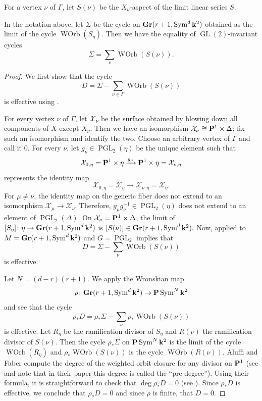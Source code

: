 \documentclass[11pt]{amsart}
\renewcommand {\P}{{\bf P}}
\providecommand {\Gr}{{\bf Gr}}
\providecommand{\GL}{\operatorname{GL}}
\providecommand{\PGL}{\operatorname{PGL}}
\providecommand {\from}{{\colon}}
\providecommand{\Sym}{\operatorname{Sym}}
\DeclareMathOperator{\WOrb}{WOrb}
\begin{document}
For a vertex \(\nu\) of \(\Gamma\), let \(S(\nu)\) be the \(X_\nu\)-aspect of the limit linear series \(S\).
\begin{theorem}\label{thm:degeneration}
  In the notation above, let \(\Sigma\) be the cycle on \(\Gr(r+1, \Sym^d\k^2)\) obtained as the limit of the cycle \(\WOrb(S_\eta)\).
  Then we have the equality of \(\GL(2)\)-invariant cycles 
  \[
    \Sigma = \sum_\nu \WOrb(S(\nu)).
  \]
\end{theorem}
\begin{proof}
  We first show that the cycle
  \[ D = \Sigma - \sum_{\nu \in \Gamma} \WOrb(S(\nu))\]
  is effective using .

    For every vertex \(\nu\) of \(\Gamma\), let \(\mathcal X_\nu\) be the surface obtained by blowing down all components of \(X\) except \(X_\nu\).
  Then we have an isomorphism \(\mathcal X_\nu \cong \P^1 \times \Delta\); fix such an isomorphism and identify the two.
  Choose an arbitrary vertex of \(\Gamma\) and call it \(0\).
  For every \(\nu\), let \(g_\nu \in \PGL_2(\eta)\) be the unique element such that 
  \[
    \mathcal X_{0, \eta} = \P^1 \times \eta \xrightarrow{g_\nu} \P^1 \times \eta = \mathcal X_{\nu, \eta}\]
  represents the identity map
  \[\mathcal X_{0,\eta} = \mathcal X_\eta \to \mathcal X_{\nu, \eta} = \mathcal X_\eta.\]
    For \(\mu \neq \nu\), the identity map on the generic fiber does not extend to an isomorphism \(\mathcal X_\mu \to \mathcal X_\nu\).
  Therefore, \(g_\mu g_\nu^{-1} \in \PGL_2(\eta)\) does not extend to an element of \(\PGL_2(\Delta)\).
  On \(\mathcal X_\nu = \P^1 \times \Delta\), the limit of \([S_\eta] \from \eta \to \Gr(r+1,\Sym^d\k^2)\) is \([S(\nu)] \in \Gr(r+1,\Sym^d\k^2).\)
  Now,  applied to \(M = \Gr(r+1, \Sym^d\k^2)\) and \(G = \PGL_2\) implies that
  \[ D = \Sigma - \sum_\nu \WOrb(S(\nu))\]
  is effective.

  Let \(N = (d-r)(r+1)\).
  We apply the Wronskian map
  \[\rho \from \Gr(r+1, \Sym^d\k^2) \to \P\Sym^N\k^2\]
  and see that the cycle
  \[
    \rho_* D = \rho_* \Sigma - \sum_\nu \rho_* \WOrb(S(\nu))
  \]
  is effective.
  Let \(R_\eta\) be the ramification divisor of \(S_\eta\) and \(R(\nu)\) the ramification divisor of \(S(\nu)\).
  Then the cycle \(\rho_*\Sigma\) on \(\P \Sym^N \k^2\) is the limit of the cycle \(\WOrb(R_\eta)\) and \(\rho_*\WOrb(S(\nu))\) is the cycle \(\WOrb(R(\nu))\).
  Aluffi and Faber compute the degree of the weighted orbit closure for any divisor on \(\P^1\) (see \cite[Proposition~1.3]{alu.fab:93*1} and note that in their paper this degree is called the ``pre-degree'').
  Using their formula, it is straightforward to check that \(\deg \rho_* D = 0\) (see ).
  Since \(\rho_*D\) is effective, we conclude that \(\rho_*D = 0\) and since \(\rho\) is finite, that \(D = 0\).
\end{proof}
\end{document}
